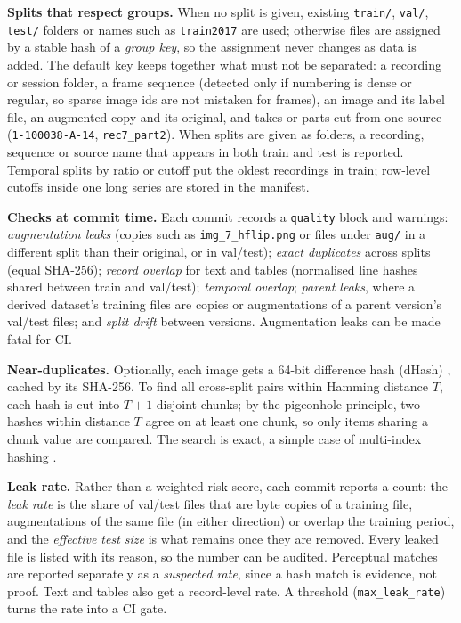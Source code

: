 \documentclass[sigconf,nonacm]{acmart}
\begin{document}
\textbf{Splits that respect groups.} When no split is given, existing \texttt{train/}, \texttt{val/},
\texttt{test/} folders or names such as \texttt{train2017} are used; otherwise files are assigned by a
stable hash of a \emph{group key}, so the assignment never changes as data is added. The default
key keeps together what must not be separated: a recording or session folder, a frame sequence
(detected only if numbering is dense or regular, so sparse image ids are not mistaken for frames),
an image and its label file, an augmented copy and its original, and takes or parts cut from one
source (\texttt{1-100038-A-14}, \texttt{rec7\_part2}). When splits are given as folders, a recording,
sequence or source name that appears in both train and test is reported. Temporal splits by ratio or
cutoff put the oldest recordings in train; row-level cutoffs inside one long series are stored in
the manifest.

\textbf{Checks at commit time.} Each commit records a \texttt{quality} block and warnings:
\emph{augmentation leaks} (copies such as \texttt{img\_7\_hflip.png} or files under \texttt{aug/} in a
different split than their original, or in val/test); \emph{exact duplicates} across splits (equal
SHA-256); \emph{record overlap} for text and tables (normalised line hashes shared between train and
val/test); \emph{temporal overlap}; \emph{parent leaks}, where a derived dataset's training files are
copies or augmentations of a parent version's val/test files; and \emph{split drift} between versions.
Augmentation leaks can be made fatal for CI.

\textbf{Near-duplicates.} Optionally, each image gets a 64-bit difference hash (dHash)
\cite{krawetz2013dhash}, cached by its SHA-256. To find all cross-split pairs within Hamming distance
$T$, each hash is cut into $T{+}1$ disjoint chunks; by the pigeonhole principle, two hashes within
distance $T$ agree on at least one chunk, so only items sharing a chunk value are compared. The
search is exact, a simple case of multi-index hashing \cite{norouzi2012mih}.

\textbf{Leak rate.} Rather than a weighted risk score, each commit reports a count: the
\emph{leak rate} is the share of val/test files that are byte copies of a training file, augmentations
of the same file (in either direction) or overlap the training period, and the \emph{effective test
size} is what remains once they are removed. Every leaked file is listed with its reason, so the
number can be audited. Perceptual matches are reported separately as a \emph{suspected rate}, since a
hash match is evidence, not proof. Text and tables also get a record-level rate. A threshold
(\texttt{max\_leak\_rate}) turns the rate into a CI gate.
\end{document}
